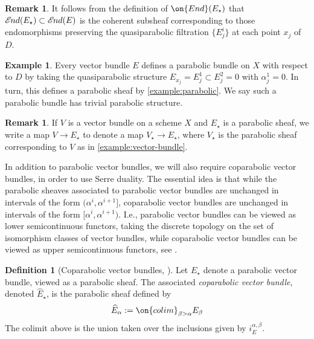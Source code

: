 \documentclass[12 pt]{amsart}
\theoremstyle{plain}
\theoremstyle{definition}
\newtheorem{definition}[subsubsection]{Definition}
\newtheorem{remark}[subsubsection]{Remark}
\newtheorem{example}[subsubsection]{Example}
\theoremstyle{remark}
\numberwithin{equation}{section}
\newcommand*{\sheafend}{\mathscr{E}\kern -1pt nd}
\begin{document}
\begin{remark}
	\label{remark:end-definition}
	It follows from the definition of $\on{End}(E_\star)$ that 
	$\sheafend(E_\star) \subset \sheafend(E)$ is the coherent subsheaf
corresponding to those endomorphisms preserving the quasiparabolic filtration
$\{E^i_j\}$ at each point $x_j$ of $D$.
\end{remark}

\begin{example}
	\label{example:vector-bundle}
	Every vector bundle $E$ defines a parabolic bundle on $X$ with respect
	to $D$ by taking the quasiparabolic structure
	$E_{x_j} = E_j^1 \subset E_{j}^2 = 0$ with $\alpha_j^1 = 0$.
	In turn, this defines a parabolic sheaf by \autoref{example:parabolic}.
	We say such a parabolic bundle has trivial parabolic structure.
\end{example}
\begin{remark}
	\label{remark:map-vector-bundle-to-parabolic}
	If $V$ is a vector bundle on a scheme $X$ and $E_\star$ is a parabolic
	sheaf, we write a map $V \to E_\star$ to denote a map $V_\star \to
	E_\star$, where $V_\star$ is the parabolic sheaf corresponding to $V$ as
	in \autoref{example:vector-bundle}.
\end{remark}


In addition to parabolic vector bundles, we will also require coparabolic vector
bundles, in order to use Serre duality.
The essential idea is that while the parabolic sheaves associated to parabolic vector bundles are unchanged in intervals of
the form $(\alpha^i, \alpha^{i+1}]$, coparabolic vector bundles are unchanged in
intervals of the form $[\alpha^i, \alpha^{i+1})$.
I.e., parabolic vector bundles can be viewed as lower semicontinuous functors, taking
the discrete topology on the set of isomorphism classes of vector bundles, while coparabolic vector
bundles 
can be viewed as upper semicontinuous functors, see \cite[Figure
1]{bodenY:moduli-spaces-of-parabolic-higgs-bundles}.
\begin{definition}[Coparabolic vector bundles,
	]
	\label{definition:coparabolic-vector-bundle}
	Let $E_\star$ denote a parabolic vector bundle, viewed as a parabolic
	sheaf.
	The associated {\em coparabolic vector bundle}, denoted
	$\widehat{E}_\star$, is the parabolic sheaf defined by
		$$\widehat{E}_\alpha :=
			\on{colim}_{\beta > \alpha} E_{\beta} $$
	The colimit above is the union taken over the inclusions given by
	$i^{\alpha,\beta}_E$.
\end{definition}
\end{document}
